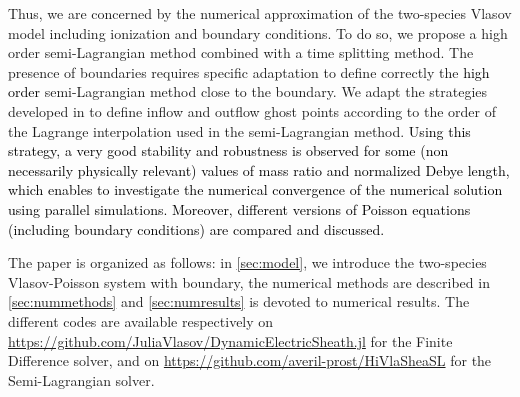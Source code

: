 \documentclass{article}
\numberwithin{equation}{section}
\newcommand{\todo}[1]{{\color{red}\textbf{#1}}}
\begin{document}
Thus, we are concerned by the numerical approximation of the two-species Vlasov model including ionization and boundary conditions.  
To do so, we propose a high order semi-Lagrangian method combined with a time splitting method. 
The presence of boundaries requires specific adaptation to define correctly the \textcolor{black}{high order} 
semi-Lagrangian method close to the boundary. 
We adapt the strategies developed in \cite{coulombelNeumannNumericalBoundary2020, boutinHighOrderNumerical2021} 
to define inflow and outflow ghost points according to the order of the Lagrange interpolation used in the semi-Lagrangian method.  
\textcolor{black}{Using this strategy, a very good stability and robustness is observed for some (non necessarily physically relevant) 
values of mass ratio and normalized Debye length, which enables to investigate the numerical 
convergence of the numerical solution using parallel simulations. 
Moreover, different versions of Poisson equations (including boundary conditions) are compared and discussed.  } 

The paper is organized as follows: in \cref{sec:model}, we introduce the two-species Vlasov-Poisson system with boundary,  
the numerical methods are described in \cref{sec:nummethods} and \cref{sec:numresults} is devoted to numerical results. 
The different codes are available respectively on \href{https://github.com/JuliaVlasov/DynamicElectricSheath.jl}{https://github.com/JuliaVlasov/DynamicElectricSheath.jl} for the Finite Difference solver, and on \href{https://github.com/averil-prost/HiVlaSheaSL}{https://github.com/averil-prost/HiVlaSheaSL} for the Semi-Lagrangian solver. 

%
\end{document}
